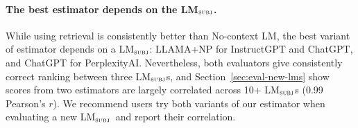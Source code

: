 \documentclass[11pt]{article}
\newcommand{\subjectLM}{LM$_\textsc{subj}$}
\begin{document}
\vspace{-.3em}
\paragraph{The best estimator depends on the \subjectLM.}
While using retrieval is consistently better than No-context LM, the best variant of estimator depends on a \subjectLM: LLAMA+NP for InstructGPT and ChatGPT, and ChatGPT for PerplexityAI. 
%
Nevertheless, both evaluators give consistently correct ranking between three \subjectLM{}s, and Section~\ref{sec:eval-new-lms} show scores from two estimators are largely correlated across 10+ \subjectLM{}s (0.99 Pearson's $r$). We recommend users try both variants of our estimator when evaluating a new \subjectLM\ and report their correlation. %









\newcommand{\myO}{$+$}
\newcommand{\myU}{$-$}
\newcommand{\strongO}{\myO}
\newcommand{\strongU}{\myU}
\end{document}
